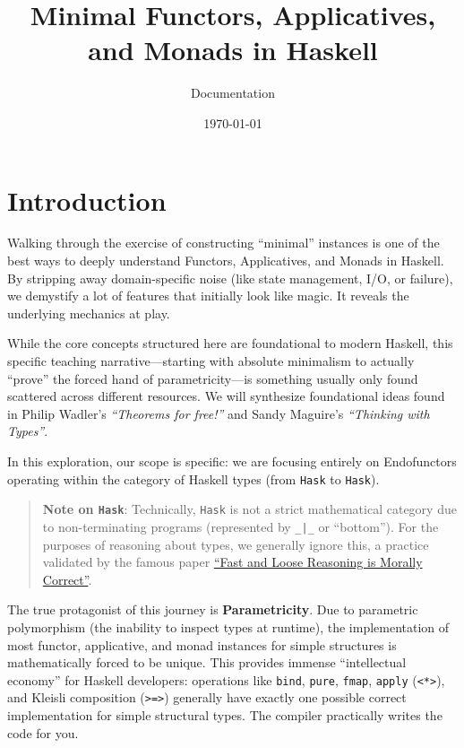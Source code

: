 \documentclass[12pt,a4paper]{article}
\title{Minimal Functors, Applicatives, and Monads in Haskell}
\author{Documentation}
\date{\today}
\begin{document}
\maketitle

\section{Introduction}

Walking through the exercise of constructing ``minimal'' instances is one of the best ways to deeply understand Functors, Applicatives, and Monads in Haskell. By stripping away domain-specific noise (like state management, I/O, or failure), we demystify a lot of features that initially look like magic. It reveals the underlying mechanics at play.

While the core concepts structured here are foundational to modern Haskell, this specific teaching narrative---starting with absolute minimalism to actually ``prove'' the forced hand of parametricity---is something usually only found scattered across different resources. We will synthesize foundational ideas found in Philip Wadler's \textit{``Theorems for free!''} and Sandy Maguire's \textit{``Thinking with Types''}.

In this exploration, our scope is specific: we are focusing entirely on Endofunctors operating within the category of Haskell types (from \texttt{Hask} to \texttt{Hask}). 

\begin{quote}
    \textbf{Note on \texttt{Hask}}: Technically, \texttt{Hask} is not a strict mathematical category due to non-terminating programs (represented by \texttt{\_|\_} or ``bottom''). For the purposes of reasoning about types, we generally ignore this, a practice validated by the famous paper \href{https://www.cse.chalmers.se/~nad/publications/danielsson-et-al-popl2006.pdf}{``Fast and Loose Reasoning is Morally Correct''}. 
\end{quote}

The true protagonist of this journey is \textbf{Parametricity}. Due to parametric polymorphism (the inability to inspect types at runtime), the implementation of most functor, applicative, and monad instances for simple structures is mathematically forced to be unique. This provides immense ``intellectual economy'' for Haskell developers: operations like \texttt{bind}, \texttt{pure}, \texttt{fmap}, \texttt{apply} (\texttt{<*>}), and Kleisli composition (\texttt{>=>}) generally have exactly one possible correct implementation for simple structural types. The compiler practically writes the code for you. 
\end{document}
